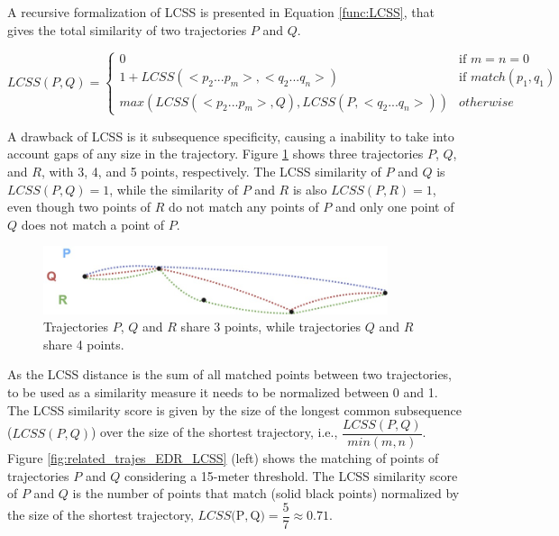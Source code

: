 \documentclass[12pt]{article}
\begin{document}
A recursive formalization of LCSS is presented in Equation \ref{func:LCSS}{, that gives the total similarity of two trajectories $P$ and $Q$}.

\begin{equation}
\label{func:LCSS}
  LCSS(P, Q) = 
  \begin{cases} 
      0 & \text{if } m = n = 0\\ 
      1 + LCSS(<p_2...p_m>,<q_2...q_n>) & \text{if } match(p_1, q_1)\\
      max(LCSS(<p_2...p_m>, Q), LCSS(P, <q_2...q_n>)) & otherwise
  \end{cases}
\end{equation}

A drawback of LCSS is it subsequence specificity, causing a inability to take into account gaps of any size in the trajectory. Figure \ref{fig:related_trajes_PQR} shows three trajectories $P$, $Q$, and $R$, with 3, 4, and 5 points, respectively. The LCSS similarity of $P$ and $Q$ is $LCSS(P, Q) = 1$, while the similarity of $P$ and $R$ is also $LCSS(P, R) = 1$, even though two points of $R$ do not match any points of $P$ and only one point of $Q$ does not match a point of $P$.


\begin{figure}[h]
\centering
\includegraphics[width=0.9\textwidth]{Related_Works/related_trajes_PQR.jpg}
\caption{\label{fig:related_trajes_PQR}Trajectories $P$, $Q$ and $R$ share 3 points, while trajectories $Q$ and $R$ share 4 points.}
\end{figure}

As the LCSS distance is the sum of all matched points between two trajectories, to be used as a similarity measure it needs to be normalized between 0 and 1. The LCSS similarity score is given by the size of the longest common subsequence ($LCSS(P, Q)$) over the size of the shortest trajectory, i.e., $\dfrac{LCSS(P, Q)}{min(m, n)}$.
Figure \ref{fig:related_trajes_EDR_LCSS} (left) shows the matching of points of trajectories $P$ and $Q$ considering a 15-meter threshold. The LCSS similarity score of $P$ and $Q$ is the {number of points that match} (solid black points) normalized by the size of the shortest trajectory, $LCSS($P$, $Q$) = \dfrac{5}{7} \approx 0.71$.
\end{document}
